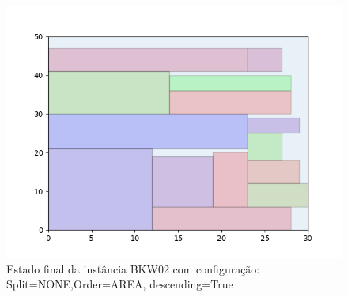 \begin{figure}[H]
    \centering
    \caption[]{Estado final da instância BKW02 com configuração: Split=NONE,Order=AREA, descending=True}
    \label{fig:bkw02-none-area-true}
    \includegraphics[scale=0.5]{output/figures/bkw/bkw02/none/area/true/00}
\end{figure}